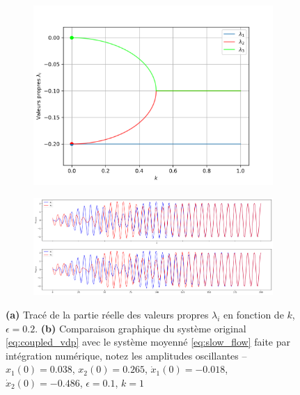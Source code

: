 \begin{figure}
    \centering
     \begin{subfigure}[b]{0.37\textwidth}
         \centering
         \includegraphics[width=\textwidth]{images/couplee/eigenvalues_eps=0.2.png}
         \caption{}
         \label{fig:eigenvals}
     \end{subfigure}
     \hfill
     \begin{subfigure}[b]{0.62\textwidth}
         \centering
         \includegraphics[width=\textwidth]{images/couplee/notitle_k=1_x0=[0.038,-0.018,0.265,-0.486]_eps=0.1.png}
         \caption{}
         \label{fig:comparison}
     \end{subfigure}    

    

    \caption{\textbf{(a)} Tracé de la partie réelle des valeurs propres $\lambda_i$ en fonction de $k$, $\epsilon=0.2$. 
        \textbf{(b)} Comparaison graphique du système original \eqref{eq:coupled_vdp} avec le système moyenné \eqref{eq:slow_flow} faite par intégration numérique, notez les amplitudes oscillantes – $x_1(0)=0.038$, $x_2(0)=0.265$, $\dot{x}_1(0)=-0.018$, $\dot{x}_2(0)=-0.486$, $\epsilon=0.1$, $k=1$}
    
\end{figure}

